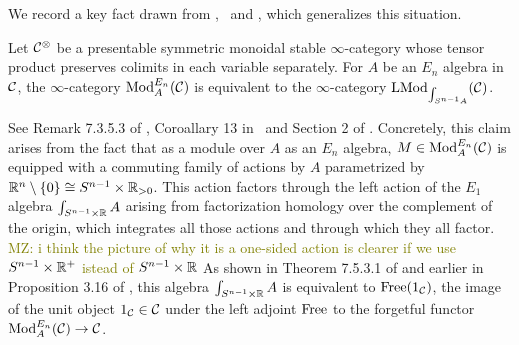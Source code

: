 \documentclass[11pt]{amsart}
\numberwithin{equation}{section}
\def\mahmoud{\textcolor{olive}{MZ: }\textcolor{olive}}
\begin{document}
\smallskip 





We record a key fact drawn from \cite{LurieHA},~\cite{FrancisHH}  and \cite{GG-Notes}, which generalizes this situation.

\begin{prp}\label{P:ModentoModSn}
Let $\mathcal C^\otimes$ be a presentable symmetric monoidal stable $\infty$-category whose tensor product preserves colimits in each variable separately.
For $A$ be an $E_n$ algebra in $\mathcal C$,
the $\infty$-category ${\rm Mod}^{E_n}_A(\mathcal C)$ is equivalent to the $\infty$-category ${\rm LMod}_{\int_{S^{n-1} A}}(\mathcal C)$.
\end{prp}

See Remark 7.3.5.3 of \cite{LurieHA}, Coroallary 13 in~\cite{GG-Notes} and Section 2 of \cite{FrancisHH}.
Concretely, this claim arises from the fact that as a module over $A$ as an $E_n$ algebra, 
$M \in {\rm Mod}^{E_n}_A(\mathcal C)$ is equipped with a commuting family of actions by $A$ parametrized by $\mathbb R^n \setminus \{0\}\cong S^{n-1} \times \mathbb R_{>0}$.
This action factors through the left action of the $E_1$ algebra $\int_{S^{n-1} \times \mathbb R} A$ arising from factorization homology over the complement of the origin,
which integrates all those actions and through which they all factor. \mahmoud{i think the picture of why it is a one-sided action is clearer if we use $S^{n-1} \times \mathbb R^+$ istead of $S^{n-1} \times \mathbb R$}
As shown in Theorem 7.5.3.1 of \cite{LurieHA} and earlier in Proposition 3.16 of \cite{FrancisHH}, 
this algebra $\int_{S^{n-1} \times \mathbb R} A$ is equivalent to ${\rm Free}(1_\mathcal C)$, 
the image of the unit object $1_\mathcal C \in \mathcal C$ under the left adjoint ${\rm Free}$ to the forgetful functor ${\rm Mod}^{E_n}_A(\mathcal C) \to \mathcal C$.

\medskip
\end{document}
